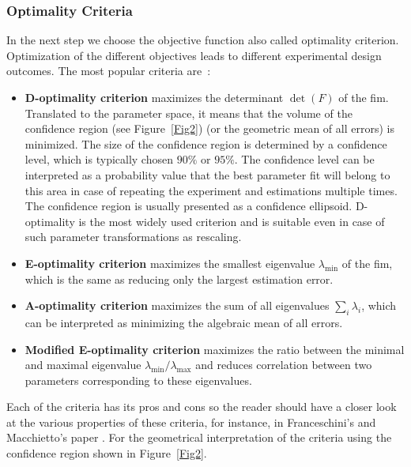 \documentclass[graybox]{svmult}
\begin{document}
\subsubsection*{Optimality Criteria}
In the next step we choose the objective function also called optimality criterion.
Optimization of the different objectives leads to different experimental design outcomes.
The most popular criteria are~\cite{balsa-cantoe.bangaj.r.COMPUTINGOPTIMALDYNAMIC2008, dette_designing_1997, walter_qualitative_1990}:
\begin{itemize}
\item \textbf{D-optimality criterion} maximizes the determinant $\det (F)$ of the \ac{fim}.
 Translated to the parameter space, it means that the volume of the confidence region (see Figure~\ref{Fig2}) (or the geometric mean of all errors) is minimized.
 The size of the confidence region is determined by a confidence level, which is typically chosen $90 \%$ or $95 \%$.
 The confidence level can be interpreted as a probability value that the best
 parameter fit will belong to this area in case of repeating the experiment and estimations multiple times.
 The confidence region is usually presented as a confidence ellipsoid.
 D-optimality is the most widely used criterion and is suitable even in case of such parameter transformations as rescaling.
\item \textbf{E-optimality criterion} maximizes the smallest eigenvalue $\lambda_{\min}$ of the \ac{fim}, which is the same as reducing only the largest estimation error.
\item \textbf{A-optimality criterion} maximizes the sum of all eigenvalues $\sum_i \lambda_i$, which can be interpreted as minimizing the algebraic mean of all errors.
\item \textbf{Modified E-optimality criterion} maximizes the ratio between the minimal and maximal eigenvalue $\lambda_{\min} / \lambda_{\max}$ and reduces correlation between two parameters corresponding to these eigenvalues.

\end{itemize}
Each of the criteria has its pros and cons so the reader should have a closer look at the various properties of these criteria, for instance, in Franceschini's and Macchietto's paper \cite{franceschiniModelbasedDesignExperiments2008}.
For the geometrical interpretation of the criteria using the confidence region shown in Figure~\ref{Fig2}.
%
%
\end{document}
